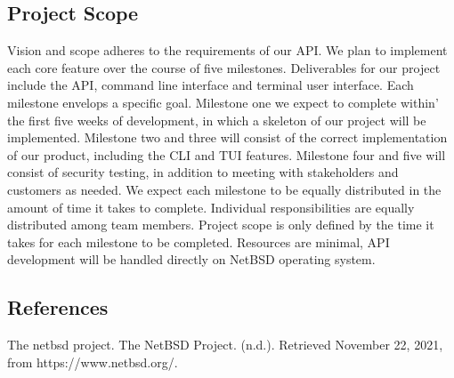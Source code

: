\subsection{Project Scope}

Vision and scope adheres to the requirements of our API. We plan to implement each core feature over the course of five milestones. 
Deliverables for our project include the API, command line interface and terminal user interface. Each milestone envelops a 
specific goal. Milestone one we expect to complete within’ the first five weeks of development, in which a skeleton of our project 
will be implemented. Milestone two and three will consist of the correct implementation of our product, including the CLI and TUI features. 
Milestone four and five will consist of security testing, in addition to meeting with stakeholders and customers as needed. We expect each 
milestone to be equally distributed in the amount of time it takes to complete. Individual responsibilities are equally distributed among 
team members. Project scope is only defined by the time it takes for each milestone to be completed. Resources are minimal, API development 
will be handled directly on NetBSD operating system. 

\subsection{References}

The netbsd project. The NetBSD Project. (n.d.). Retrieved November 22, 2021, from https://www.netbsd.org/. 

